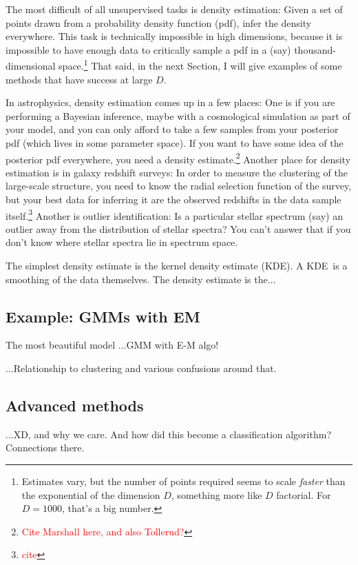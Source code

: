 \documentclass[12pt, twoside, letterpaper]{article}
\newcommand{\sectionname}{Section}
\newcommand{\acronym}[1]{{\small{#1}}}
\newcommand{\KDE}{\acronym{KDE}}
\newcommand{\todo}[1]{\textcolor{red}{#1}}  %
\begin{document}
The most difficult of all unsupervised tasks is density estimation:
Given a set of points drawn from a probability density function (pdf),
infer the density everywhere.
This task is technically impossible in high dimensions, because it is
impossible to have enough data to critically sample a pdf in a (say)
thousand-dimensional space.\footnote{Estimates vary, but the number of points
  required seems to scale \emph{faster} than the exponential of the dimension $D$,
  something more like $D$ factorial. For $D=1000$, that's a big number.}
That said, in the next \sectionname, I will give examples of some methods
that have success at large $D$.

In astrophysics, density estimation comes up in a few places:
One is if you are performing a Bayesian inference, maybe with a cosmological simulation
as part of your model, and you can only afford to take a few samples from your posterior
pdf (which lives in some parameter space).
If you want to have some idea of the posterior pdf everywhere, you
need a density estimate.\footnote{\todo{Cite Marshall here, and also
    Tollerud?}}
Another place for density estimation is in galaxy redshift surveys:
In order to measure the clustering of the large-scale structure, you need to
know the radial selection function of the survey, but your best data for inferring
it are the observed redshifts in the data sample itself.\footnote{\todo{cite}}
Another is outlier identification: Is a particular stellar spectrum (say) an
outlier away from the distribution of stellar spectra?
You can't answer that if you don't know where stellar spectra lie in spectrum space.

The simplest density estimate is the kernel density estimate (\KDE).
A \KDE\ is a smoothing of the data themselves.
The density estimate is the...

\subsection{Example: GMMs with EM}

The most beautiful model 
...GMM with E-M algo!

...Relationship to clustering and various confusions around that.

\subsection{Advanced methods}

...XD, and why we care. And how did this become a classification algorithm? Connections there.
\end{document}
